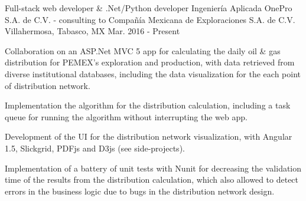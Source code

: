 


\begin{cventries}


\cventry
{Full-stack web developer \& .Net/Python developer} %
{Ingeniería Aplicada OnePro S.A. de C.V. - consulting to Compañía Mexicana de Exploraciones S.A. de C.V.} %
{Villahermosa, Tabasco, MX} %
{Mar. 2016 - Present} %
{ %
\begin{cvitems}
	\item{Collaboration on an ASP.Net MVC 5 app for calculating the daily oil \& gas distribution for PEMEX's exploration and production, with data retrieved from diverse institutional databases, including the data visualization for the each point of distribution network.}
	\item{Implementation the algorithm for the distribution calculation, including a task queue for running the algorithm without interrupting the web app.}
	\item{Development of the UI for the distribution network visualization, with Angular 1.5, Slickgrid, PDFjs and D3js {\tiny (see side-projects)}.}
	\item {Implementation of a battery of unit tests with Nunit for decreasing the validation time of the results from the distribution calculation, which also allowed to detect errors in the business logic due to bugs in the distribution network design.}
	
\end{cvitems}
}



\end{cventries}
